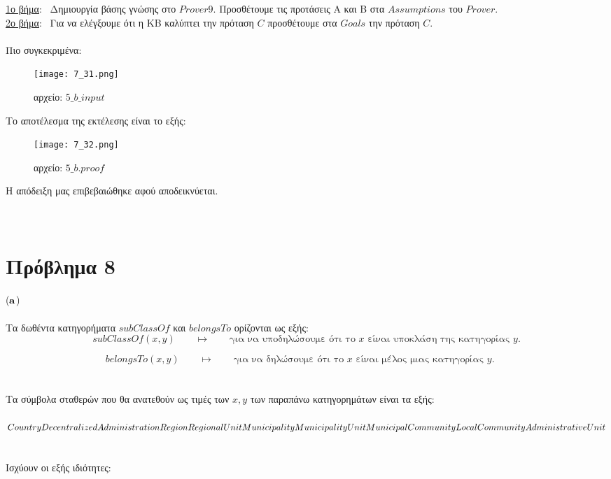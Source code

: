 \documentclass[10pt]{article}
\begin{document}
\underline{1ο βήμα}: \ Δημιουργία βάσης γνώσης στο $Prover9$. Προσθέτουμε τις προτάσεις Α και Β στα $Assumptions$ του $Prover$. \\ 

\underline{2ο βήμα}: \ Για να ελέγξουμε ότι η ΚΒ καλύπτει την πρόταση $C$ προσθέτουμε στα $Goals$ την πρόταση $C$. \\ \\ 
Πιο συγκεκριμένα:
\begin{figure}[H]
    \texttt{[image: 7\_31.png]}\\
    \caption{αρχείο: $5\_b\_input$ }
\end{figure} 
Το αποτέλεσμα της εκτέλεσης είναι το εξής:
\begin{figure}[H]
    \texttt{[image: 7\_32.png]}\\
    \caption{αρχείο: $5\_b.proof$ }
\end{figure} 
Η απόδειξη μας επιβεβαιώθηκε αφού αποδεικνύεται.
 \\ \\ \\
\section*{Πρόβλημα 8}
\vspace{5mm}
($\bf a$) \normalfont \\ \\
Τα δωθέντα κατηγορήματα $subClassOf$ και $belongsTo$ ορίζονται ως εξής:
\\
\[
subClassOf(x,y)\ \ \ \ \ \ \ \ \ \mapsto \ \ \ \ \ \ \ \ \ \text{για να υποδηλώσουμε ότι το $x$ είναι υποκλάση της κατηγορίας $y$.} 
\]

\[
belongsTo(x,y)\ \ \ \ \ \ \ \ \ \mapsto \ \ \ \ \ \ \ \ \ \text{για να δηλώσουμε ότι το $x$  είναι μέλος μιας κατηγορίας $y$.}  \ \ \ \ \ \
\]
\\ \\ Τα σύμβολα σταθερών που θα ανατεθούν ως τιμές των $x,y$ των παραπάνω κατηγορημάτων είναι τα εξής: \\ \\
$Country \\
Decentralized Administration \\
Region \\
RegionalUnit \\
Municipality \\
MunicipalityUnit \\
MunicipalCommunity \\
LocalCommunity \\
AdministrativeUnit$ \\ \\ \\
Ισχύουν οι εξής ιδιότητες:\\
\end{document}
